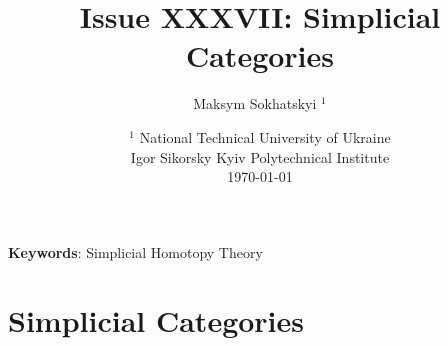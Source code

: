 \documentclass{article}
\begin{document}
\title{Issue XXXVII: Simplicial Categories}
\author{Maksym Sokhatskyi $^1$}
\date{ $^1$ National Technical University of Ukraine \\
       \small Igor Sikorsky Kyiv Polytechnical Institute \\
       \today }

\maketitle

\begin{abstract}
\end{abstract}

{\bf Keywords}: Simplicial Homotopy Theory

\ifincludeTOC
  \tableofcontents
\fi

\section{Simplicial Categories}
\end{document}
